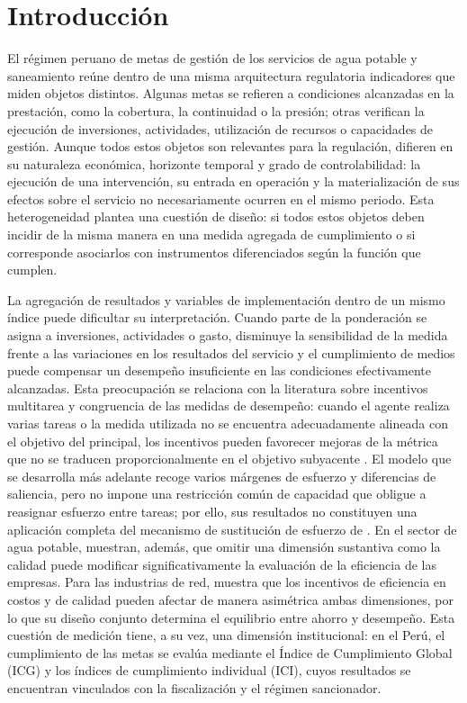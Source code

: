 \section{Introducción}

El régimen peruano de metas de gestión de los servicios de agua potable y saneamiento reúne dentro de una misma arquitectura regulatoria indicadores que miden objetos distintos. Algunas metas se refieren a condiciones alcanzadas en la prestación, como la cobertura, la continuidad o la presión; otras verifican la ejecución de inversiones, actividades, utilización de recursos o capacidades de gestión. Aunque todos estos objetos son relevantes para la regulación, difieren en su naturaleza económica, horizonte temporal y grado de controlabilidad: la ejecución de una intervención, su entrada en operación y la materialización de sus efectos sobre el servicio no necesariamente ocurren en el mismo periodo. Esta heterogeneidad plantea una cuestión de diseño: si todos estos objetos deben incidir de la misma manera en una medida agregada de cumplimiento o si corresponde asociarlos con instrumentos diferenciados según la función que cumplen.

La agregación de resultados y variables de implementación dentro de un mismo índice puede dificultar su interpretación. Cuando parte de la ponderación se asigna a inversiones, actividades o gasto, disminuye la sensibilidad de la medida frente a las variaciones en los resultados del servicio y el cumplimiento de medios puede compensar un desempeño insuficiente en las condiciones efectivamente alcanzadas. Esta preocupación se relaciona con la literatura sobre incentivos multitarea y congruencia de las medidas de desempeño: cuando el agente realiza varias tareas o la medida utilizada no se encuentra adecuadamente alineada con el objetivo del principal, los incentivos pueden favorecer mejoras de la métrica que no se traducen proporcionalmente en el objetivo subyacente \citep{holmstrom1991multitask,baker1992incentive}. El modelo que se desarrolla más adelante recoge varios márgenes de esfuerzo y diferencias de saliencia, pero no impone una restricción común de capacidad que obligue a reasignar esfuerzo entre tareas; por ello, sus resultados no constituyen una aplicación completa del mecanismo de sustitución de esfuerzo de \citet{holmstrom1991multitask}. En el sector de agua potable, \citet{PicazoTadeo2008Quality} muestran, además, que omitir una dimensión sustantiva como la calidad puede modificar significativamente la evaluación de la eficiencia de las empresas. Para las industrias de red, \citet{ovaere2023} muestra que los incentivos de eficiencia en costos y de calidad pueden afectar de manera asimétrica ambas dimensiones, por lo que su diseño conjunto determina el equilibrio entre ahorro y desempeño. Esta cuestión de medición tiene, a su vez, una dimensión institucional: en el Perú, el cumplimiento de las metas se evalúa mediante el Índice de Cumplimiento Global (ICG) y los índices de cumplimiento individual (ICI), cuyos resultados se encuentran vinculados con la fiscalización y el régimen sancionador.

